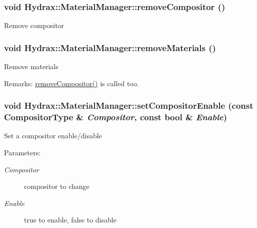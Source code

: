 \begin{CompactItemize}
{\subsubsection[{removeCompositor}]{\setlength{\rightskip}{0pt plus 5cm}void Hydrax::MaterialManager::removeCompositor ()}}
\label{class_hydrax_1_1_material_manager_160d27bd9ff0fac665ce5ce7c4e013e9}


Remove compositor \hypertarget{class_hydrax_1_1_material_manager_93baa6272c91d1be5ec9bef054a9bb0d}{
\subsubsection[{removeMaterials}]{\setlength{\rightskip}{0pt plus 5cm}void Hydrax::MaterialManager::removeMaterials ()}}
\label{class_hydrax_1_1_material_manager_93baa6272c91d1be5ec9bef054a9bb0d}


Remove materials \begin{Desc}
\item[Remarks:]\hyperlink{class_hydrax_1_1_material_manager_160d27bd9ff0fac665ce5ce7c4e013e9}{removeCompositor()} is called too. \end{Desc}
\hypertarget{class_hydrax_1_1_material_manager_61bccef34841ce9c0ce6c53ff27f136b}{
\subsubsection[{setCompositorEnable}]{\setlength{\rightskip}{0pt plus 5cm}void Hydrax::MaterialManager::setCompositorEnable (const {\bf CompositorType} \& {\em Compositor}, \/  const bool \& {\em Enable})}}
\label{class_hydrax_1_1_material_manager_61bccef34841ce9c0ce6c53ff27f136b}


Set a compositor enable/disable \begin{Desc}
\item[Parameters:]
\begin{description}
\item[{\em Compositor}]compositor to change \item[{\em Enable}]true to enable, false to disable \end{description}
\end{Desc}
\hypertarget{class_hydrax_1_1_material_manager_8f696ec503c68b349a417b4c82cf9dfc}{
}
\end{CompactItemize}
